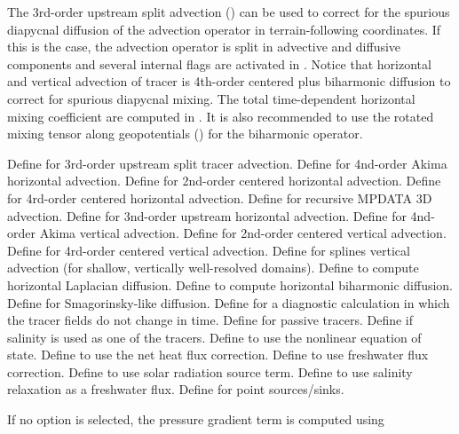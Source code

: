 \begin{klist}
The 3rd-order upstream split advection () can be used
to correct for the spurious diapycnal diffusion of the advection
operator in terrain-following coordinates. If this is the case, the
advection operator is split in advective and diffusive components
and several internal flags are activated in .  Notice
that horizontal and vertical advection of tracer is 4th-order centered
plus biharmonic diffusion to correct for spurious diapycnal mixing.
The total time-dependent horizontal mixing coefficient are computed
in . It is also recommended to use the rotated mixing
tensor along geopotentials () for the biharmonic
operator.
  \begin{klist}
     Define for 3rd-order upstream split
  tracer advection.
     Define for 4nd-order Akima horizontal advection.
     Define for 2nd-order centered horizontal
advection.
     Define for 4rd-order centered horizontal
advection.
     Define for recursive MPDATA 3D advection.
     Define for 3nd-order upstream horizontal advection.
     Define for 4nd-order Akima vertical advection.
     Define for 2nd-order centered vertical
advection.
     Define for 4rd-order centered vertical
advection.
     Define for splines vertical advection
 (for shallow, vertically well-resolved domains).
         Define to compute
  horizontal Laplacian diffusion.
         Define to compute
  horizontal biharmonic diffusion.
     Define for Smagorinsky-like diffusion.
      Define for a diagnostic
  calculation in which the tracer fields do not change in time.
      Define for passive tracers.
          Define if salinity is used as one of the
  tracers.
     Define to use the nonlinear
  equation of state.
      Define to use the net heat
  flux correction.
      Define to use freshwater flux correction.
      Define to use solar radiation source term.
      Define to use salinity relaxation as a
  freshwater flux.
     Define for point sources/sinks.
  \end{klist}
   \mbox{}
If no option is selected, the pressure gradient term is computed using

\end{klist}
